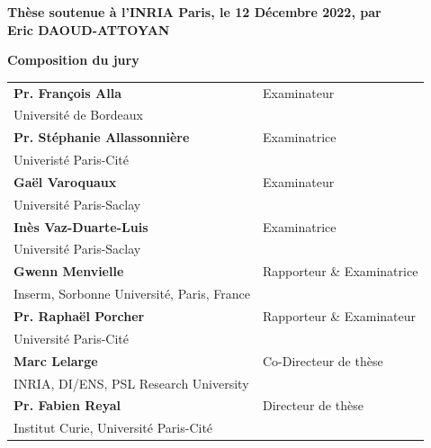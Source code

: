\documentclass[12pt, a4paper]{book}
\begin{document}
\begin{titlepage}
  \textbf{Thèse soutenue à l'INRIA Paris, le 12 Décembre 2022, par}\\
  \bigskip
  \Large {\color{Prune} \textbf{Eric DAOUD-ATTOYAN}} %

  \vspace{\fill} %

  \bigskip

  \flushleft
  \small \textbf{Composition du jury}\\
  \vspace{2mm}
  \scriptsize
  \begin{tabular}{|p{7cm}l}
    \arrayrulecolor{Prune}

    \textbf{Pr. François Alla}                 & Examinateur                \\
    Université de Bordeaux                     &                            \\
    \textbf{Pr. Stéphanie Allassonnière}       & Examinatrice               \\
    Univeristé Paris-Cité                      &                            \\
    \textbf{Gaël Varoquaux}                    & Examinateur                \\
    Université Paris-Saclay                    &                            \\
    \textbf{Inès Vaz-Duarte-Luis}              & Examinatrice               \\
    Université Paris-Saclay                    &                            \\
    \textbf{Gwenn Menvielle}                   & Rapporteur \& Examinatrice \\
    Inserm, Sorbonne Université, Paris, France &                            \\
    \textbf{Pr. Raphaël Porcher}               & Rapporteur \& Examinateur  \\
    Université Paris-Cité                      &                            \\
    \textbf{Marc Lelarge}                      & Co-Directeur de thèse      \\
    INRIA, DI/ENS, PSL Research University     &                            \\
    \textbf{Pr. Fabien Reyal}                  & Directeur de thèse         \\
    Institut Curie, Université Paris-Cité      &                            \\
  \end{tabular}

\end{titlepage}
\end{document}
